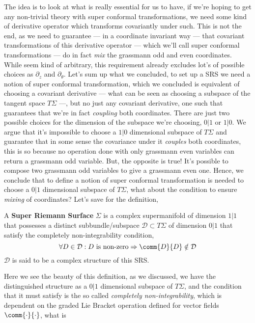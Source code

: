 The idea is to look at what is really essential for us to have, if we're hoping to get any non-trivial theory 
with super conformal transformations, we need some kind of derivative operator which transforms covariantly under 
such. This is not the end, as we need to guarantee --- in a coordinate invariant way --- that covariant transformations 
of this derivative operator --- which we'll call super conformal transformations --- do in fact \textit{mix} the 
grassmann odd and even coordinates. While seem kind of arbitrary, this requirement already excludes lot's of 
possible choices as $\partial_z$ and $\partial_\theta$. Let's sum up what we concluded, to set up a SRS we 
need a notion of super conformal transformation, which we concluded is equivalent of choosing a 
covariant derivative --- what can be seen as choosing a subspace of the tangent space $T\Sigma$ ---, but no just 
any covariant derivative, one such that guarantees that we're in fact \textit{coupling} both 
coordinates. There are just two possible choices for the dimension of the subspace we're choosing, $0|1$ or $1|0$. 
We argue that it's impossible to choose a $1|0$ dimensional subspace of $T\Sigma$ and guarantee that in some sense 
the covariance under it \textit{couples} both coordinates, this is so because no operation done with only grassmann 
even variables can return a grassmann odd variable. But, the opposite is true! It's possible to compose two 
grassmann odd variables to give a grassmann even one. Hence, we conclude that to define a notion 
of super conformal transformation is needed to choose a $0|1$ dimensional subspace of $T\Sigma$, what about the 
condition to ensure \textit{mixing} of coordinates? Let's save for the definition\cite{witten:revisited,witten:moduli,witten:integration},
\begin{definition}
    A \textbf{Super Riemann Surface} $\Sigma$ is a complex supermanifold of dimension $1|1$ that 
    possesses a distinct subbundle/subspace $\mathcal D\subset T\Sigma$ of dimension $0|1$ that satisfy the 
    completely non-integrability condition, $$\forall D\in\mathcal D: D\textnormal{ is non-zero}\Rightarrow \comm{D}{D}\notin \mathcal D$$ 
    $\mathcal D$ is said to be a complex structure of this SRS.\label{definition:srs}
\end{definition}
Here we see the beauty of this definition, as we discussed, we have the distinguished structure as a $0|1$ dimensional 
subspace of $T\Sigma$, and the condition that it must satisfy is the so called \textit{completely non-integrability}, 
which is dependent on the graded Lie Bracket operation defined for vector fields $\comm{\cdot}{\cdot}$, what is 
